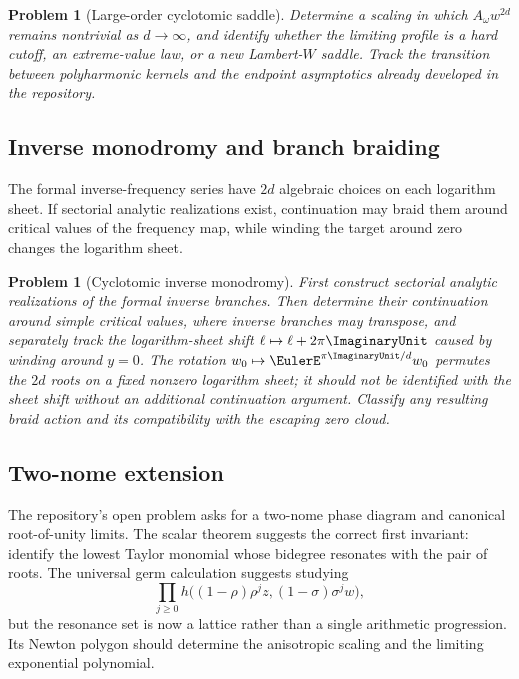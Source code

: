 \documentclass[11pt]{article}
\newtheorem{problem}[theorem]{Problem}
\theoremstyle{definition}
\begin{document}
\begin{problem}[Large-order cyclotomic saddle]
Determine a scaling in which
\(
 A_\omega w^{2d}
\)
remains nontrivial as $d\to\infty$, and identify whether the limiting profile is a hard cutoff, an extreme-value law, or a new Lambert-$W$ saddle.  Track the transition between polyharmonic kernels and the endpoint asymptotics already developed in the repository.
\end{problem}

\subsection{Inverse monodromy and branch braiding}

The formal inverse-frequency series have $2d$ algebraic choices on each
logarithm sheet.  If sectorial analytic realizations exist, continuation may
braid them around critical values of the frequency map, while winding the
target around zero changes the logarithm sheet.

\begin{problem}[Cyclotomic inverse monodromy]
First construct sectorial analytic realizations of the formal inverse branches.
Then determine their continuation around simple \emph{critical values}, where
inverse branches may transpose, and separately track the logarithm-sheet shift
$\ell\mapsto\ell+2\pi\ImaginaryUnit$ caused by winding around $y=0$.  The rotation
$w_0\mapsto\EulerE^{\pi\ImaginaryUnit/d}w_0$ permutes the $2d$ roots on a fixed nonzero
logarithm sheet; it should not be identified with the sheet shift without an
additional continuation argument.  Classify any resulting braid action and
its compatibility with the escaping zero cloud.
\end{problem}

\subsection{Two-nome extension}

The repository's open problem asks for a two-nome phase diagram and canonical root-of-unity limits.  The scalar theorem suggests the correct first invariant: identify the lowest Taylor monomial whose bidegree resonates with the pair of roots.  The universal germ calculation suggests studying
\[
 \prod_{j\ge0}h\bigl((1-\rho)\rho^jz,(1-\sigma)\sigma^jw\bigr),
\]
but the resonance set is now a lattice rather than a single arithmetic progression.  Its Newton polygon should determine the anisotropic scaling and the limiting exponential polynomial.
\end{document}
